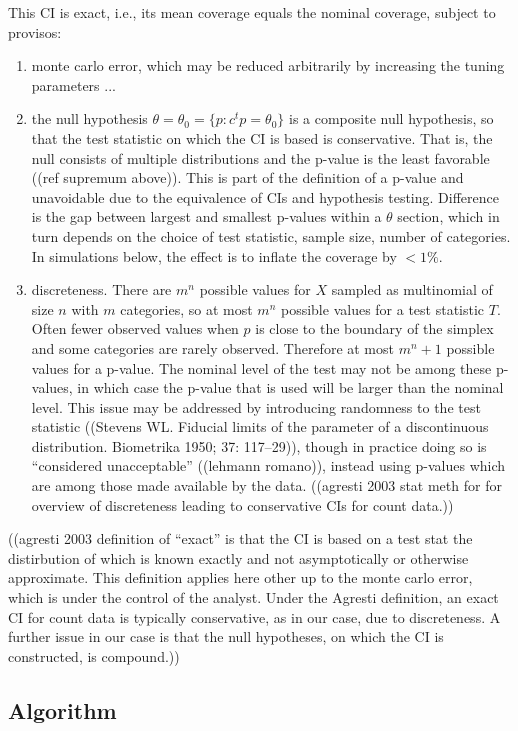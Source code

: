 \documentclass{article}
\newcommand{\p}p
\renewcommand{\c}c
\begin{document}
This CI is exact, i.e., its mean coverage equals the nominal coverage, subject to provisos:
\begin{enumerate}
\item monte carlo error, which may be reduced arbitrarily by increasing the tuning parameters ...
\item the null hypothesis $\theta=\theta_0=\{\p : \c^t\p=\theta_0\}$
  is a composite null hypothesis, so that the test statistic on which
  the CI is based is conservative. That is, the null consists of
  multiple distributions and the p-value is the least favorable ((ref
  supremum above)). This is part of the definition of a p-value and
  unavoidable due to the equivalence of CIs and hypothesis
  testing. Difference is the gap between largest and smallest p-values
  within a $\theta$ section, which in turn depends on the choice of test statistic, sample size, number of categories. In simulations below, the effect is to
  inflate the coverage by $<1\%$.
\item discreteness. There are $m^n$ possible values for $X$ sampled as
  multinomial of size $n$ with $m$ categories, so at most $m^n$
  possible values for a test statistic $T$. Often fewer observed
  values when $p$ is close to the boundary of the simplex and some
  categories are rarely observed. Therefore at most $m^n+1$ possible
  values for a p-value.  The nominal level of the test may not be
  among these p-values, in which case the p-value that is used will be
  larger than the nominal level. This issue may be addressed by
  introducing randomness to the test statistic ((Stevens WL. Fiducial
  limits of the parameter of a discontinuous distribution. Biometrika
  1950; 37: 117–29)), though in practice doing so is ``considered
  unacceptable'' ((lehmann romano)), instead using p-values which are
  among those made available by the data. ((agresti 2003 stat meth for
  for overview of discreteness leading to conservative CIs for count data.))
\end{enumerate}
((agresti 2003 definition of ``exact'' is that the CI is based on a
test stat the distirbution of which is known exactly and not
asymptotically or otherwise approximate. This definition applies here
other up to the monte carlo error, which is under the control of the
analyst. Under the Agresti definition, an exact CI for count data is typically
conservative, as in our case, due to discreteness. A further issue in our case is that the null hypotheses, on which the CI is constructed, is compound.))


\subsection{Algorithm}
\end{document}

